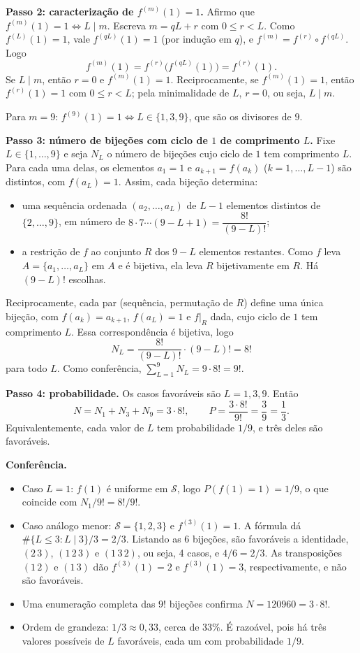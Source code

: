 \documentclass{article}%
\begin{document}
\textbf{Passo 2: caracterização de $f^{(m)}(1)=1$.} Afirmo que $f^{(m)}(1)=1 \iff L\mid m$. Escreva $m=qL+r$ com $0\le r<L$. Como $f^{(L)}(1)=1$, vale $f^{(qL)}(1)=1$ (por indução em $q$), e $f^{(m)}=f^{(r)}\circ f^{(qL)}$. Logo
\[
f^{(m)}(1)=f^{(r)}\big(f^{(qL)}(1)\big)=f^{(r)}(1).
\]
Se $L\mid m$, então $r=0$ e $f^{(m)}(1)=1$. Reciprocamente, se $f^{(m)}(1)=1$, então $f^{(r)}(1)=1$ com $0\le r<L$; pela minimalidade de $L$, $r=0$, ou seja, $L\mid m$.

Para $m=9$: $f^{(9)}(1)=1 \iff L\in\{1,3,9\}$, que são os divisores de $9$.

\textbf{Passo 3: número de bijeções com ciclo de $1$ de comprimento $L$.} Fixe $L\in\{1,\dots,9\}$ e seja $N_L$ o número de bijeções cujo ciclo de $1$ tem comprimento $L$. Para cada uma delas, os elementos $a_1=1$ e $a_{k+1}=f(a_k)$ ($k=1,\dots,L-1$) são distintos, com $f(a_L)=1$. Assim, cada bijeção determina:
\begin{itemize}
\item[(i)] uma sequência ordenada $(a_2,\dots,a_L)$ de $L-1$ elementos distintos de $\{2,\dots,9\}$, em número de $8\cdot 7\cdots(9-L+1)=\dfrac{8!}{(9-L)!}$;
\item[(ii)] a restrição de $f$ ao conjunto $R$ dos $9-L$ elementos restantes. Como $f$ leva $A=\{a_1,\dots,a_L\}$ em $A$ e é bijetiva, ela leva $R$ bijetivamente em $R$. Há $(9-L)!$ escolhas.
\end{itemize}
Reciprocamente, cada par (sequência, permutação de $R$) define uma única bijeção, com $f(a_k)=a_{k+1}$, $f(a_L)=1$ e $f|_R$ dada, cujo ciclo de $1$ tem comprimento $L$. Essa correspondência é bijetiva, logo
\[
N_L=\frac{8!}{(9-L)!}\cdot(9-L)!=8!
\]
para todo $L$. Como conferência, $\sum_{L=1}^{9}N_L=9\cdot 8!=9!$.

\textbf{Passo 4: probabilidade.} Os casos favoráveis são $L=1,3,9$. Então
\[
N=N_1+N_3+N_9=3\cdot 8!,
\qquad
P=\frac{3\cdot 8!}{9!}=\frac{3}{9}=\frac{1}{3}.
\]
Equivalentemente, cada valor de $L$ tem probabilidade $1/9$, e três deles são favoráveis.

\textbf{Conferência.}
\begin{itemize}
\item Caso $L=1$: $f(1)$ é uniforme em $\mathcal{S}$, logo $P(f(1)=1)=1/9$, o que coincide com $N_1/9!=8!/9!$.
\item Caso análogo menor: $\mathcal{S}=\{1,2,3\}$ e $f^{(3)}(1)=1$. A fórmula dá $\#\{L\le 3 : L\mid 3\}/3=2/3$. Listando as 6 bijeções, são favoráveis a identidade, $(2\,3)$, $(1\,2\,3)$ e $(1\,3\,2)$, ou seja, 4 casos, e $4/6=2/3$. As transposições $(1\,2)$ e $(1\,3)$ dão $f^{(3)}(1)=2$ e $f^{(3)}(1)=3$, respectivamente, e não são favoráveis.
\item Uma enumeração completa das $9!$ bijeções confirma $N=120960=3\cdot 8!$.
\item Ordem de grandeza: $1/3\approx 0,33$, cerca de $33\%$. É razoável, pois há três valores possíveis de $L$ favoráveis, cada um com probabilidade $1/9$.
\end{itemize}
\end{document}
